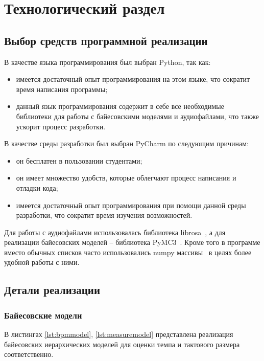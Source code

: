 \section{Технологический раздел}

\subsection{Выбор средств программной реализации}

В качестве языка программирования был выбран Python, так как:

\begin{itemize}
	\item имеется достаточный опыт программирования на этом языке, что сократит время написания программы;
	\item данный язык программирования содержит в себе все необходимые библиотеки для работы с байесовскими моделями и аудиофайлами, что также ускорит процесс разработки.
\end{itemize}

В качестве среды разработки был выбран PyCharm по следующим причинам:

\begin{itemize}
	\item он бесплатен в пользовании студентами;
	\item он имеет множество удобств, которые облегчают процесс написания и отладки кода;
	\item имеется достаточный опыт программирования при помощи данной среды разработки, что сократит время изучения возможностей.
\end{itemize}

Для работы с аудиофайлами использовалась библиотека librosa~\cite{librosa}, а для реализации байесовских моделей -- библиотека PyMC3~\cite{pymc3_docs}. Кроме того в программе вместо обычных списков часто использовались numpy массивы~\cite{numpy} в целях более удобной работы с ними.

\subsection{Детали реализации}

\subsubsection{Байесовские модели}

В листингах \ref{lst:bpmmodel}, \ref{lst:measuremodel} представлена реализация байесовских иерархических моделей для оценки темпа и тактового размера соответственно.

